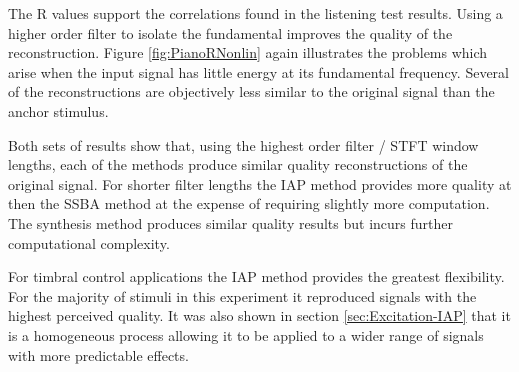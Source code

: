 		The R values support the correlations found in the listening test results. Using a higher order
		filter to isolate the fundamental improves the quality of the reconstruction. Figure \ref{fig:PianoRNonlin}
		again illustrates the problems which arise when the input signal has little energy at its fundamental
		frequency. Several of the reconstructions are objectively less similar to the original signal than the
		anchor stimulus.

		Both sets of results show that, using the highest order filter / STFT window lengths, each of the methods
		produce similar quality reconstructions of the original signal. For shorter filter lengths the IAP method
		provides more quality at then the SSBA method at the expense of requiring slightly more computation. The
		synthesis method produces similar quality results but incurs further computational complexity. 
		
		For timbral control applications the IAP method provides the greatest flexibility. For the majority of
		stimuli in this experiment it reproduced signals with the highest perceived quality. It was also shown in
		section \ref{sec:Excitation-IAP} that it is a homogeneous process allowing it to be applied to a wider
		range of signals with more predictable effects.
	
